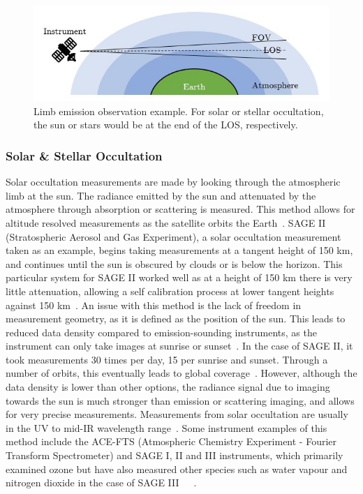  \begin{figure}
\centering
  \includegraphics{chap2_images/Limb_emission_geometry_example.JPG}
  \caption{Limb emission observation example. For solar or stellar occultation, the sun or stars would be at the end of the LOS, respectively.}
  \label{fig:limb_emission_geometry}
\end{figure}

\subsubsection{Solar \& Stellar Occultation}
Solar occultation measurements are made by looking through the atmospheric limb at the sun. The radiance emitted by the sun and attenuated by the atmosphere through absorption or scattering is measured. This method allows for altitude resolved measurements as the satellite orbits the Earth~\citep{SPARC}. SAGE II (Stratospheric Aerosol and Gas Experiment), a solar occultation measurement taken as an example, begins taking measurements at a tangent height of 150 km, and continues until the sun is obscured by clouds or is below the horizon. This particular system for SAGE II worked well as at a height of 150 km there is very little attenuation, allowing a self calibration process at lower tangent heights against 150 km~\citep{SAGEII_solar_occultation}. An issue with this method is the lack of freedom in measurement geometry, as it is defined as the position of the sun. This leads to reduced data density compared to emission-sounding instruments, as the instrument can only take images at sunrise or sunset~\citep{SPARC}. In the case of SAGE II, it took measurements 30 times per day, 15 per sunrise and sunset. Through a number of orbits, this eventually leads to global coverage~\citep{SAGEII_solar_occultation}. However, although the data density is lower than other options, the radiance signal due to imaging towards the sun is much stronger than emission or scattering imaging, and allows for very precise measurements. Measurements from solar occultation are usually in the UV to mid-IR wavelength range~\citep{SPARC}. Some instrument examples of this method include the ACE-FTS (Atmospheric Chemistry Experiment - Fourier Transform Spectrometer) and SAGE I, II and III instruments, which primarily examined ozone but have also measured other species such as water vapour and nitrogen dioxide in the case of SAGE III~\citep{ACE_FTS}~\citep{SAGEI_and_II}~\citep{SAGE_III}.

